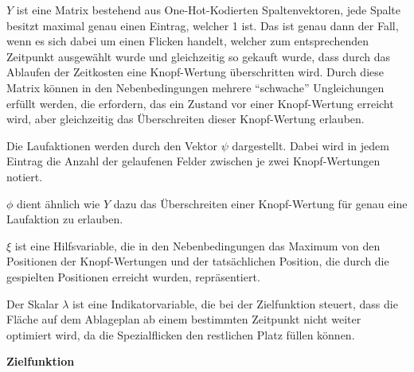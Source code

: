 $Y$ ist eine Matrix bestehend aus One-Hot-Kodierten Spaltenvektoren, \dash jede Spalte besitzt maximal genau einen Eintrag, welcher 1 ist. Das ist genau dann der Fall, wenn es sich dabei um einen Flicken handelt, welcher zum entsprechenden Zeitpunkt ausgewählt wurde und gleichzeitig so gekauft wurde, dass durch das Ablaufen der Zeitkosten eine Knopf-Wertung überschritten wird. Durch diese Matrix können in den Nebenbedingungen mehrere \enquote{schwache} Ungleichungen erfüllt werden, die erfordern, das ein Zustand vor einer Knopf-Wertung erreicht wird, aber gleichzeitig das Überschreiten dieser Knopf-Wertung erlauben.

Die Laufaktionen werden durch den Vektor $\psi$ dargestellt. Dabei wird in jedem Eintrag die Anzahl der gelaufenen Felder zwischen je zwei Knopf-Wertungen notiert.

$\phi$ dient ähnlich wie $Y$ dazu das Überschreiten einer Knopf-Wertung für genau eine Laufaktion zu erlauben.

$\xi$ ist eine Hilfsvariable, die in den Nebenbedingungen das Maximum von den Positionen der Knopf-Wertungen und der tatsächlichen Position, die durch die gespielten Positionen erreicht wurden, repräsentiert.

Der Skalar $\lambda$ ist eine Indikatorvariable, die bei der Zielfunktion steuert, dass die Fläche auf dem Ablageplan ab einem bestimmten Zeitpunkt nicht weiter optimiert wird, da die Spezialflicken den restlichen Platz füllen können.

\textbf{Zielfunktion}

